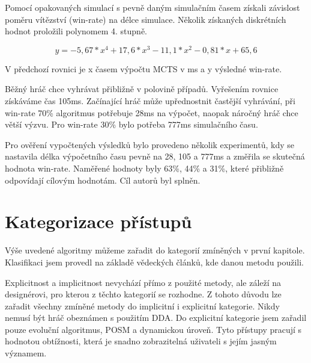 Pomocí opakovaných simulací s pevně daným simulačním časem získali závislost poměru vítězství (win-rate) na délce simulace. Několik získaných diskrétních hodnot proložili polynomem 4. stupně.

\begin{equation}
	y=-5,67*x^4+17,6*x^3-11,1*x^2-0,81*x+65,6
\end{equation}

V předchozí rovnici je x časem výpočtu MCTS v ms a y výsledné win-rate.

Běžný hráč chce vyhrávat přibližně v polovině případů. Vyřešením rovnice získáváme čas 105ms. Začínající hráč může upřednostnit častější vyhrávání, při win-rate 70\% algoritmus potřebuje 28ms na výpočet, naopak náročný hráč chce větší výzvu. Pro win-rate 30\% bylo potřeba 777ms simulačního času.

Pro ověření vypočtených výsledků bylo provedeno několik experimentů, kdy se nastavila délka výpočetního času pevně na 28, 105 a 777ms a změřila se skutečná hodnota win-rate. Naměřené hodnoty byly 63\%, 44\% a 31\%, které přibližně odpovídají cílovým hodnotám. Cíl autorů byl splněn.

\section{Kategorizace přístupů}

Výše uvedené algoritmy můžeme zařadit do kategorií zmíněných v první kapitole. Klasifikaci jsem provedl na základě vědeckých článků, kde danou metodu použili.

Explicitnost a implicitnost nevychází přímo z použité metody, ale záleží na designérovi, pro kterou z těchto kategorií se rozhodne. Z tohoto důvodu lze zařadit všechny zmíněné metody do implicitní i explicitní kategorie. Nikdy nemusí být hráč obeznámen s použitím DDA. Do explicitní kategorie jsem zařadil pouze evoluční algoritmus, POSM a dynamickou úroveň. Tyto přístupy pracují s hodnotou obtížnosti, která je snadno zobrazitelná uživateli s jejím jasným významem.

